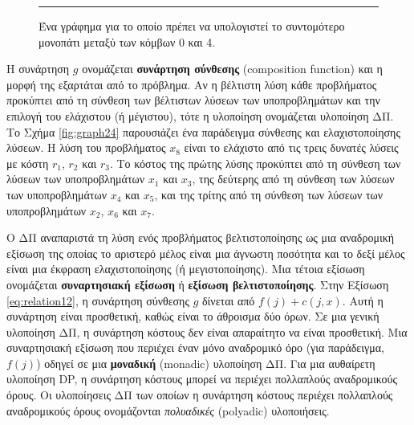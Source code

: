 \documentclass[12pt,a4paper]{article} %
\begin{document}
{{\begin{figure}[H]
\noindent\rule{\textwidth}{0.2pt}
\caption{Ένα γράφημα για το οποίο πρέπει να υπολογιστεί το συντομότερο μονοπάτι μεταξύ των κόμβων 0 και 4.}
\label{fig:graph23}
\end{figure}

\par\vspace{0.3cm}
\noindent
Η συνάρτηση $g$ ονομάζεται \textbf{συνάρτηση σύνθεσης} (composition function) και η μορφή της 
εξαρτάται από το πρόβλημα. Αν η βέλτιστη λύση κάθε προβλήματος προκύπτει από τη σύνθεση των 
βέλτιστων λύσεων των υποπροβλημάτων και την επιλογή του ελάχιστου (ή μέγιστου), τότε η υλοποίηση 
ονομάζεται υλοποίηση ΔΠ. Το Σχήμα \ref{fig:graph24} παρουσιάζει ένα παράδειγμα σύνθεσης και ελαχιστοποίησης λύσεων. Η λύση του 
προβλήματος $x_8$ είναι το ελάχιστο από τις τρεις δυνατές λύσεις με κόστη $r_1$, $r_2$ και $r_3$. 
Το κόστος της πρώτης λύσης προκύπτει από τη σύνθεση των λύσεων των υποπροβλημάτων $x_1$ και $x_3$, 
της δεύτερης από τη σύνθεση των λύσεων των υποπροβλημάτων $x_4$ και $x_5$, και της τρίτης από τη 
σύνθεση των λύσεων των υποπροβλημάτων $x_2$, $x_6$ και $x_7$.

Ο ΔΠ αναπαριστά τη λύση ενός προβλήματος βελτιστοποίησης ως μια αναδρομική εξίσωση της οποίας το αριστερό μέλος είναι 
μια άγνωστη ποσότητα και το δεξί μέλος είναι μια έκφραση ελαχιστοποίησης (ή μεγιστοποίησης). Μια τέτοια εξίσωση ονομάζεται 
\textbf{συναρτησιακή εξίσωση} ή \textbf{εξίσωση βελτιστοποίησης}.
Στην Εξίσωση \ref{eq:relation12}, η συνάρτηση σύνθεσης $g$ δίνεται από $f(j) + c(j, x)$. Αυτή η συνάρτηση είναι 
προσθετική, καθώς είναι το άθροισμα δύο όρων. Σε μια γενική υλοποίηση ΔΠ, η συνάρτηση κόστους δεν 
είναι απαραίτητο να είναι προσθετική. Μια συναρτησιακή εξίσωση που περιέχει έναν μόνο αναδρομικό όρο 
(για παράδειγμα, $f(j)$) οδηγεί σε μια \textbf{μοναδική} (monadic) υλοποίηση ΔΠ. Για μια αυθαίρετη υλοποίηση
DP, η συνάρτηση κόστους μπορεί να περιέχει πολλαπλούς αναδρομικούς όρους. Οι υλοποίησεις ΔΠ των οποίων η 
συνάρτηση κόστους περιέχει πολλαπλούς αναδρομικούς όρους ονομάζονται \textit{πολυαδικές} (polyadic) υλοποιήσεις.

}}
\end{document}
